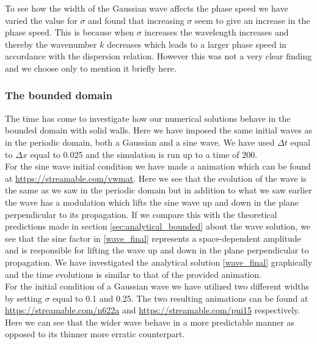 \documentclass[12pt]{article}
\numberwithin{figure}{section}
\numberwithin{table}{section}
\begin{document}
\noindent To see how the width of the Gaussian wave affects the phase speed we have varied the value for $\sigma$ and found that increasing $\sigma$ seem to give an increase in the phase speed. This is because when $\sigma$ increases the wavelength increases and thereby the wavenumber $k$ decreases which leads to a larger phase speed in accordance with the dispersion relation. However this was not a very clear finding and we choose only to mention it briefly here. \\





\subsubsection{The bounded domain}


\noindent The time has come to investigate how our numerical solutions behave in the bounded domain with solid walls. Here we have imposed the same initial waves as in the periodic domain, both a Gaussian and a sine wave. We have used $\Delta t$ equal to $\Delta x$ equal to 0.025 and the simulation is run up to a time of 200. \\ 

\noindent For the sine wave initial condition we have made a animation which can be found at \url{https://streamable.com/vwmat}. Here we see that the evolution of the wave is the same as we saw in the periodic domain but in addition to what we saw earlier the wave has a modulation which lifts the sine wave up and down in the plane perpendicular to its propagation. If we compare this with the theoretical predictions made in section \ref{sec:analytical_bounded} about the wave solution, we see that the sine factor in \eqref{wave_final} represents a space-dependent amplitude and is responsible for lifting the wave up and down in the plane perpendicular to propagation. We have investigated the analytical solution \eqref{wave_final} graphically and the time evolutions is similar to that of the provided animation.\\

\noindent For the initial condition of a Gaussian wave we have utilized two different widths by setting $\sigma$ equal to 0.1 and 0.25. The two resulting animations can be found at \url{https://streamable.com/n622a} and \url{https://streamable.com/pui15} respectively. Here we can see that the wider wave behave in a more predictable manner as opposed to its thinner more erratic counterpart.\\
\end{document}
